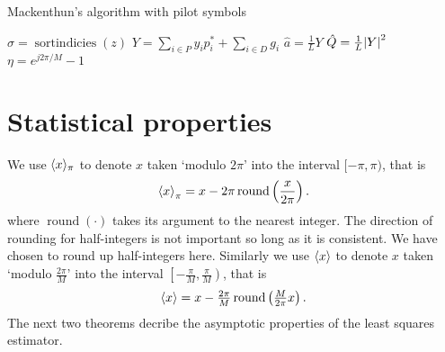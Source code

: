 \documentclass[journal]{IEEEtran}
\begin{document}
\begin{algorithm} \label{alg:loglinear}
\SetAlCapFnt{\small}
\SetAlTitleFnt{}
\caption{Mackenthun's algorithm with pilot symbols}
\DontPrintSemicolon
{}
$\sigma = \operatorname{sortindicies}(z)$  \;
$Y = \sum_{i \in P} y_i p_i^* + \sum_{i \in D} g_i $ \;
$\hat{a} = \frac{1}{L} Y$ \;
$\hat{Q} = \frac{1}{L}{\left| Y \right|}^2$  \;
$\eta = e^{j2\pi/M} - 1$ \;
\end{algorithm}


\section{Statistical properties}

We use $\langle x \rangle_\pi$ to denote $x$ taken `modulo $2\pi$' into the interval $[-\pi, \pi)$, that is
\[
\left\langle x \right\rangle_\pi = x - 2\pi\operatorname{round}\left(\frac{x}{2\pi}\right).
\]
where $\operatorname{round}(\cdot)$ takes its argument to the nearest integer.  The direction of rounding for half-integers is not important so long as it is consistent.  We have chosen to round up half-integers here.  Similarly we use $\langle x \rangle$ to denote $x$ taken `modulo $\tfrac{2\pi}{M}$' into the interval $\left[-\tfrac{\pi}{M}, \tfrac{\pi}{M}\right)$, that is
\[
\left\langle x \right\rangle = x - \tfrac{2\pi}{M}\operatorname{round}\left(\tfrac{M}{2\pi}x\right).
\]
The next two theorems decribe the asymptotic properties of the least squares estimator.
\end{document}
